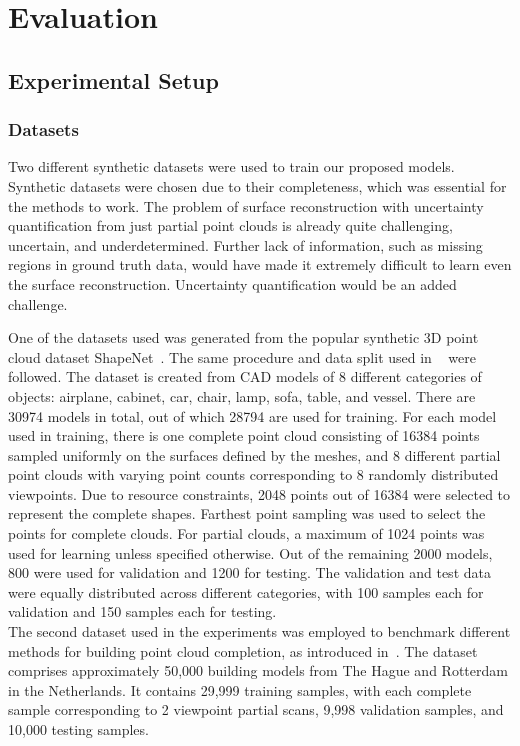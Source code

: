 \chapter{Evaluation}\label{ch:evaluation}



\section{Experimental Setup}


    \subsection{Datasets}
    Two different synthetic datasets were used to train our proposed models. Synthetic datasets were chosen due to their completeness, which was essential for the methods to work. The problem of surface reconstruction with uncertainty quantification from just partial point clouds is already quite challenging, uncertain, and underdetermined. Further lack of information, such as missing regions in ground truth data, would have made it extremely difficult to learn even the surface reconstruction. Uncertainty quantification would be an added challenge. 
    \newline
    
    One of the datasets used was generated from the popular synthetic 3D point cloud dataset ShapeNet~\cite{ShapeNet}. The same procedure and data split used in ~\cite{PCN} were followed. The dataset is created from CAD models of 8 different categories of objects: airplane, cabinet, car, chair, lamp, sofa, table, and vessel. There are 30974 models in total, out of which 28794 are used for training. For each model used in training, there is one complete point cloud consisting of 16384 points sampled uniformly on the surfaces defined by the meshes, and 8 different partial point clouds with varying point counts corresponding to 8 randomly distributed viewpoints. Due to resource constraints, 2048 points out of 16384 were selected to represent the complete shapes. Farthest point sampling was used to select the points for complete clouds. For partial clouds, a maximum of 1024 points was used for learning unless specified otherwise. Out of the remaining 2000 models, 800 were used for validation and 1200 for testing. The validation and test data were equally distributed across different categories, with 100 samples each for validation and 150 samples each for testing. 
    \\
    The second dataset used in the experiments was employed to benchmark different methods for building point cloud completion, as introduced in~\cite{BuildingPCC}. The dataset comprises approximately 50,000 building models from The Hague and Rotterdam in the Netherlands. It contains 29,999 training samples, with each complete sample corresponding to 2 viewpoint partial scans, 9,998 validation samples, and 10,000 testing samples. 


